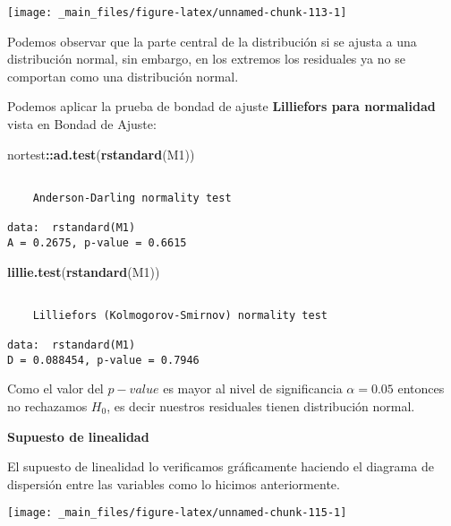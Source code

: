\documentclass[
  a4paper,
  oneside,
  openany]{book}
\newenvironment{Shaded}{\begin{snugshade}}{\end{snugshade}}
\newcommand{\FunctionTok}[1]{\textcolor[rgb]{0.13,0.29,0.53}{\textbf{#1}}}
\newcommand{\NormalTok}[1]{#1}
\newcommand{\SpecialCharTok}[1]{\textcolor[rgb]{0.81,0.36,0.00}{\textbf{#1}}}
\begin{document}
\begin{center}\texttt{[image: \_main\_files/figure-latex/unnamed-chunk-113-1]} \end{center}

Podemos observar que la parte central de la distribución si se ajusta a una distribución normal, sin embargo, en los extremos los residuales ya no se comportan como una distribución normal.

Podemos aplicar la prueba de bondad de ajuste \textbf{Lilliefors para normalidad} vista en Bondad de Ajuste:

\begin{Shaded}
\begin{Highlighting}[]
\NormalTok{nortest}\SpecialCharTok{::}\FunctionTok{ad.test}\NormalTok{(}\FunctionTok{rstandard}\NormalTok{(M1))}
\end{Highlighting}
\end{Shaded}

\begin{verbatim}

    Anderson-Darling normality test

data:  rstandard(M1)
A = 0.2675, p-value = 0.6615
\end{verbatim}

\begin{Shaded}
\begin{Highlighting}[]
\FunctionTok{lillie.test}\NormalTok{(}\FunctionTok{rstandard}\NormalTok{(M1))}
\end{Highlighting}
\end{Shaded}

\begin{verbatim}

    Lilliefors (Kolmogorov-Smirnov) normality test

data:  rstandard(M1)
D = 0.088454, p-value = 0.7946
\end{verbatim}

Como el valor del \(p-value\) es mayor al nivel de significancia \(\alpha=0.05\) entonces no rechazamos \(H_{0}\), es decir nuestros residuales tienen distribución normal.

\textbf{Supuesto de linealidad}

El supuesto de linealidad lo verificamos gráficamente haciendo el diagrama de dispersión entre las variables como lo hicimos anteriormente.

\begin{center}\texttt{[image: \_main\_files/figure-latex/unnamed-chunk-115-1]} \end{center}
\end{document}
